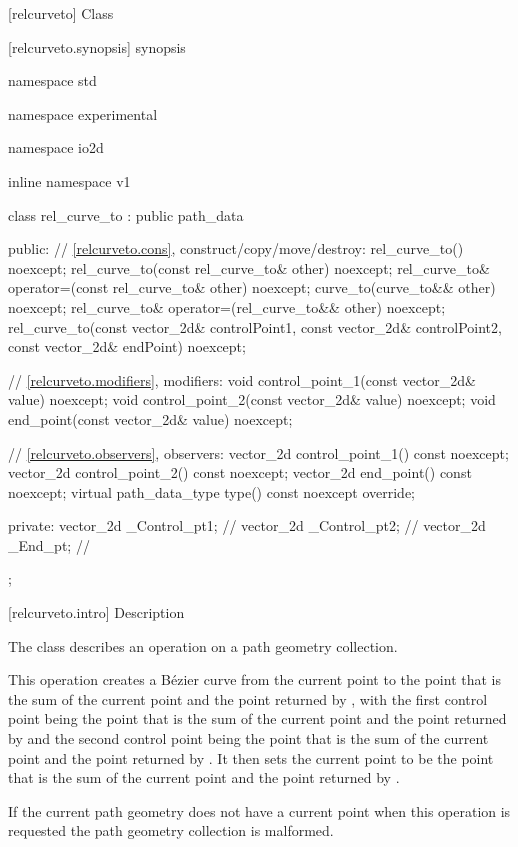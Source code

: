  [relcurveto] {Class }

 [relcurveto.synopsis] { synopsis}

\begin{codeblock}
namespace std { namespace experimental { namespace io2d { inline namespace v1 {
  class rel_curve_to : public path_data {
  public:
    // \ref{relcurveto.cons}, construct/copy/move/destroy:
    rel_curve_to() noexcept;
    rel_curve_to(const rel_curve_to& other) noexcept;
    rel_curve_to& operator=(const rel_curve_to& other) noexcept;
    curve_to(curve_to&& other) noexcept;
    rel_curve_to& operator=(rel_curve_to&& other) noexcept;
    rel_curve_to(const vector_2d& controlPoint1, const vector_2d& controlPoint2,
      const vector_2d& endPoint) noexcept;

    // \ref{relcurveto.modifiers}, modifiers:
    void control_point_1(const vector_2d& value) noexcept;
    void control_point_2(const vector_2d& value) noexcept;
    void end_point(const vector_2d& value) noexcept;


    // \ref{relcurveto.observers}, observers:
    vector_2d control_point_1() const noexcept;
    vector_2d control_point_2() const noexcept;
    vector_2d end_point() const noexcept;
    virtual path_data_type type() const noexcept override;
    
  private:
    vector_2d _Control_pt1; // \expos
    vector_2d _Control_pt2; // \expos
    vector_2d _End_pt;      // \expos
  };
} } } }
\end{codeblock}

 [relcurveto.intro] { Description}

\pnum
{}
The class  describes an operation on a path geometry collection.

\pnum
This operation creates a B\'ezier curve from the current point to the point that is the sum of the current point and the point returned by , with the first control point being the point that is the sum of the current point and the point returned by  and the second control point being the point that is the sum of the current point and the point returned by . It then sets the current point to be the point that is the sum of the current point and the point returned by .

\pnum
If the current path geometry does not have a current point when this operation is requested the path geometry collection is malformed.

